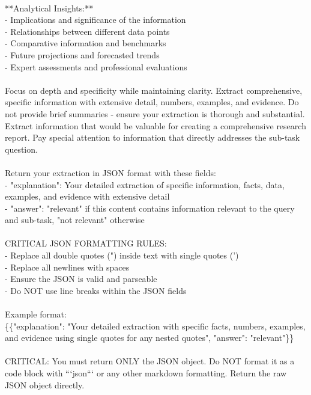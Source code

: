\documentclass{article} %
\begin{document}
\begin{examplebox}
\\
**Analytical Insights:**\\
- Implications and significance of the information\\
- Relationships between different data points\\
- Comparative information and benchmarks\\
- Future projections and forecasted trends\\
- Expert assessments and professional evaluations\\
\\
Focus on depth and specificity while maintaining clarity. Extract comprehensive, specific information with extensive detail, numbers, examples, and evidence. Do not provide brief summaries - ensure your extraction is thorough and substantial. Extract information that would be valuable for creating a comprehensive research report. Pay special attention to information that directly addresses the sub-task question.\\
\\
Return your extraction in JSON format with these fields:\\
- "explanation": Your detailed extraction of specific information, facts, data, examples, and evidence with extensive detail\\
- "answer": "relevant" if this content contains information relevant to the query and sub-task, "not relevant" otherwise\\
\\
CRITICAL JSON FORMATTING RULES:\\
- Replace all double quotes (") inside text with single quotes (')\\
- Replace all newlines with spaces\\
- Ensure the JSON is valid and parseable\\
- Do NOT use line breaks within the JSON fields\\
\\
Example format: \\
\{\{"explanation": "Your detailed extraction with specific facts, numbers, examples, and evidence using single quotes for any nested quotes", "answer": "relevant"\}\}\\
\\
CRITICAL: You must return ONLY the JSON object. Do NOT format it as a code block with ```json``` or any other markdown formatting. Return the raw JSON object directly.
\end{examplebox}
\end{document}
